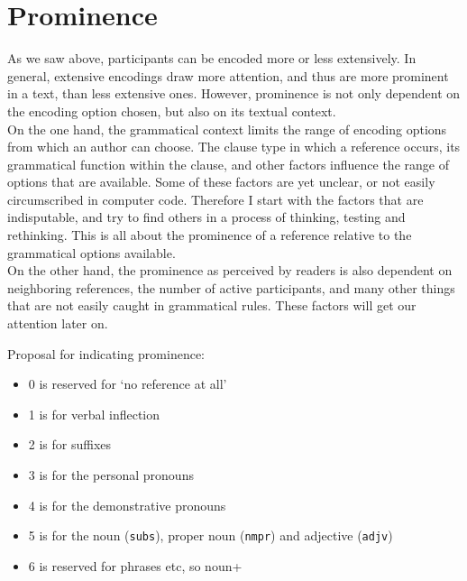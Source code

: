 \documentclass{report}
\newcommand{\mi}[1]{\lstinline{#1}}
\begin{document}
\section{Prominence}
As we saw above, participants can be encoded more or less extensively. In general, extensive encodings draw more attention, and thus are more prominent in a text, than less extensive ones. However, prominence is not only dependent on the encoding option chosen, but also on its textual context.\\
On the one hand, the grammatical context limits the range of encoding options from which an author can choose. The clause type in which a reference occurs, its grammatical function within the clause, and other factors influence the range of options that are available. Some of these factors are yet unclear, or not easily circumscribed in computer code. Therefore I start with the factors that are indisputable, and try to find others in a process of thinking, testing and rethinking. This is all about the prominence of a reference relative to the grammatical options available.\\
On the other hand, the prominence as perceived by readers is also dependent on neighboring references, the number of active participants, and many other things that are not easily caught in grammatical rules. These factors will get our attention later on.

Proposal for indicating prominence:
\begin{itemize}
\item 0 is reserved for `no reference at all'
\item 1 is for verbal inflection
\item 2 is for suffixes
\item 3 is for the personal pronouns
\item 4 is for the demonstrative pronouns
\item 5 is for the noun (\mi{subs}), proper noun (\mi{nmpr}) and adjective (\mi{adjv})
\item 6 is reserved for phrases etc, so noun+
\end{itemize}
\end{document}
